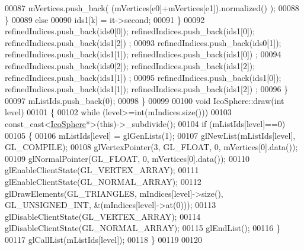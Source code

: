 \begin{DoxyCode}
00087         mVertices.push\_back( (mVertices[e0]+mVertices[e1]).normalized() );
00088       \}
00089       \textcolor{keywordflow}{else}
00090         ids1[k] = it->second;
00091     \}
00092     refinedIndices.push\_back(ids0[0]); refinedIndices.push\_back(ids1[0]); refinedIndices.push\_back(ids1[2])
      ;
00093     refinedIndices.push\_back(ids0[1]); refinedIndices.push\_back(ids1[1]); refinedIndices.push\_back(ids1[0])
      ;
00094     refinedIndices.push\_back(ids0[2]); refinedIndices.push\_back(ids1[2]); refinedIndices.push\_back(ids1[1])
      ;
00095     refinedIndices.push\_back(ids1[0]); refinedIndices.push\_back(ids1[1]); refinedIndices.push\_back(ids1[2])
      ;
00096   \}
00097   mListIds.push\_back(0);
00098 \}
00099 
00100 \textcolor{keywordtype}{void} IcoSphere::draw(\textcolor{keywordtype}{int} level)
00101 \{
00102   \textcolor{keywordflow}{while} (level>=\textcolor{keywordtype}{int}(mIndices.size()))
00103     \textcolor{keyword}{const\_cast<}\hyperlink{class_ico_sphere}{IcoSphere}*\textcolor{keyword}{>}(\textcolor{keyword}{this})->\_subdivide();
00104   \textcolor{keywordflow}{if} (mListIds[level]==0)
00105   \{
00106     mListIds[level] = glGenLists(1);
00107     glNewList(mListIds[level], GL\_COMPILE);
00108       glVertexPointer(3, GL\_FLOAT, 0, mVertices[0].data());
00109       glNormalPointer(GL\_FLOAT, 0, mVertices[0].data());
00110       glEnableClientState(GL\_VERTEX\_ARRAY);
00111       glEnableClientState(GL\_NORMAL\_ARRAY);
00112       glDrawElements(GL\_TRIANGLES, mIndices[level]->size(), GL\_UNSIGNED\_INT, &(mIndices[level]->at(0)));
00113       glDisableClientState(GL\_VERTEX\_ARRAY);
00114       glDisableClientState(GL\_NORMAL\_ARRAY);
00115     glEndList();
00116   \}
00117   glCallList(mListIds[level]);
00118 \}
00119 
00120 
\end{DoxyCode}
